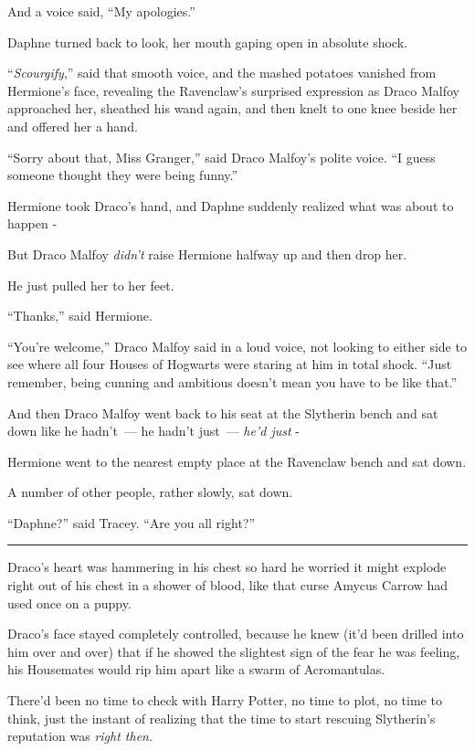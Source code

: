 And a voice said, ``My apologies.''

Daphne turned back to look, her mouth gaping open in absolute shock.

``\emph{Scourgify},'' said that smooth voice, and the mashed potatoes vanished from Hermione's face, revealing the Ravenclaw's surprised expression as Draco Malfoy approached her, sheathed his wand again, and then knelt to one knee beside her and offered her a hand.

``Sorry about that, Miss Granger,'' said Draco Malfoy's polite voice. ``I guess someone thought they were being funny.''

Hermione took Draco's hand, and Daphne suddenly realized what was about to happen -

But Draco Malfoy \emph{didn't} raise Hermione halfway up and then drop her.

He just pulled her to her feet.

``Thanks,'' said Hermione.

``You're welcome,'' Draco Malfoy said in a loud voice, not looking to either side to see where all four Houses of Hogwarts were staring at him in total shock. ``Just remember, being cunning and ambitious doesn't mean you have to be like that.''

And then Draco Malfoy went back to his seat at the Slytherin bench and sat down like he hadn't~--- he hadn't just~--- \emph{he'd just} -

Hermione went to the nearest empty place at the Ravenclaw bench and sat down.

A number of other people, rather slowly, sat down.

``Daphne?'' said Tracey. ``Are you all right?''

\begin{center}\rule{3in}{0.4pt}\end{center}

Draco's heart was hammering in his chest so hard he worried it might explode right out of his chest in a shower of blood, like that curse Amycus Carrow had used once on a puppy.

Draco's face stayed completely controlled, because he knew (it'd been drilled into him over and over) that if he showed the slightest sign of the fear he was feeling, his Housemates would rip him apart like a swarm of Acromantulas.

There'd been no time to check with Harry Potter, no time to plot, no time to think, just the instant of realizing that the time to start rescuing Slytherin's reputation was \emph{right then}.


